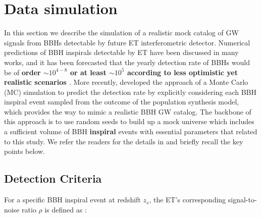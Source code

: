 \documentclass[twocolumn]{aastex62}
\begin{document}
\vspace{1cm}
\section{Data simulation} \label{sec_simulation}
In this section we describe the simulation of a realistic mock catalog of GW signals from BBHs detectable by future ET interferometric detector. Numerical predictions of BBH inspirals detectable by ET 
have been discussed in many works, and it has been forecasted that the yearly detection rate of BBHs would be of \textbf{order $\sim10^{4-8}$ \citep{Abernathy2011} or at least $\sim10^{5}$ according to less optimistic yet realistic scenarios \citep{Ola2013, Biesiada2014}}. More recently, \citet{Yang2019} developed the approach of a Monte Carlo (MC) simulation to predict the detection rate by explicitly considering each BBH inspiral event sampled from the outcome of the population synthesis model, which provides the way to mimic a realistic BBH GW catalog. The backbone of this approach is to use random seeds to build up a mock universe which includes a sufficient volume of BBH \textbf{inspiral} events with essential parameters that related to this study. We refer the readers for the details in \citet[][Section 2, therein]{Yang2019}  and briefly recall the key points below.

\subsection{Detection Criteria} \label{subsec_criteria}
For a specific BBH inspiral event at redshift $z_s$, the ET's corresponding signal-to-noise ratio $\rho$ is defined as \citep{Abernathy2011}:
\end{document}
